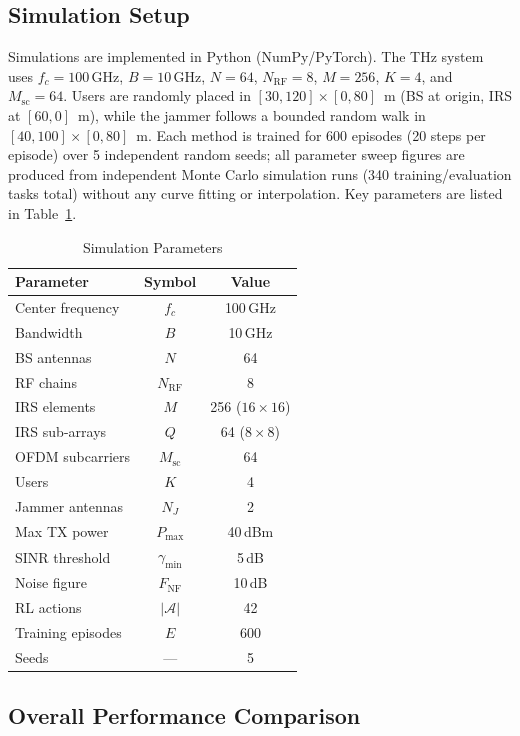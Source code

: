 \documentclass[journal,twocolumn]{IEEEtran}
\begin{document}
\subsection{Simulation Setup}

Simulations are implemented in Python (NumPy/PyTorch). The THz system uses $f_c = 100\,\text{GHz}$, $B = 10\,\text{GHz}$, $N=64$, $N_{\mathrm{RF}}=8$, $M=256$, $K=4$, and $M_{\mathrm{sc}}=64$. Users are randomly placed in $[30,120]\!\times\![0,80]$~m (BS at origin, IRS at $[60,0]$~m), while the jammer follows a bounded random walk in $[40,100]\!\times\![0,80]$~m. Each method is trained for 600 episodes (20 steps per episode) over 5 independent random seeds; all parameter sweep figures are produced from independent Monte Carlo simulation runs (340 training/evaluation tasks total) without any curve fitting or interpolation. Key parameters are listed in Table~\ref{tab:params}.

\begin{table}[t]
\centering
\caption{Simulation Parameters}
\label{tab:params}
\begin{tabular}{lcc}
\toprule
\textbf{Parameter} & \textbf{Symbol} & \textbf{Value} \\
\midrule
Center frequency & $f_c$ & 100\,GHz \\
Bandwidth & $B$ & 10\,GHz \\
BS antennas & $N$ & 64 \\
RF chains & $N_{\text{RF}}$ & 8 \\
IRS elements & $M$ & 256 ($16 \times 16$) \\
IRS sub-arrays & $Q$ & 64 ($8 \times 8$) \\
OFDM subcarriers & $M_{\text{sc}}$ & 64 \\
Users & $K$ & 4 \\
Jammer antennas & $N_J$ & 2 \\
Max TX power & $P_{\max}$ & 40\,dBm \\
SINR threshold & $\gamma_{\min}$ & 5\,dB \\
Noise figure & $F_{\text{NF}}$ & 10\,dB \\
RL actions & $|\mathcal{A}|$ & 42 \\
Training episodes & $E$ & 600 \\
Seeds & --- & 5 \\
\bottomrule
\end{tabular}
\end{table}

\subsection{Overall Performance Comparison}
\end{document}
